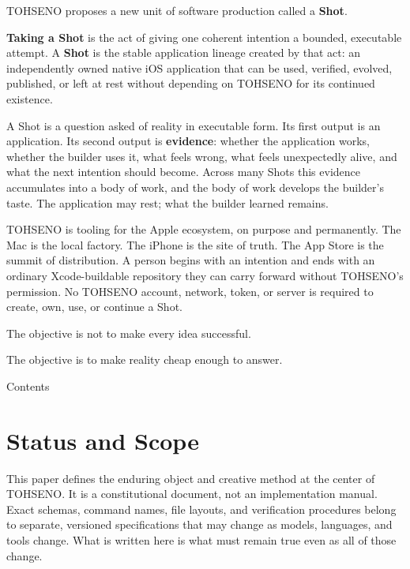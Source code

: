 \documentclass[11pt]{article}
\newcommand{\TOH}{TOHSENO}
\begin{document}
\TOH{} proposes a new unit of software production called a \textbf{Shot}.

\textbf{Taking a Shot} is the act of giving one coherent intention a
bounded, executable attempt. A \textbf{Shot} is the stable application
lineage created by that act: an independently owned native iOS
application that can be used, verified, evolved, published, or left at
rest without depending on \TOH{} for its continued existence.

A Shot is a question asked of reality in executable form. Its first
output is an application. Its second output is \textbf{evidence}:
whether the application works, whether the builder uses it, what feels
wrong, what feels unexpectedly alive, and what the next intention should
become. Across many Shots this evidence accumulates into a body of work,
and the body of work develops the builder's taste. The application may
rest; what the builder learned remains.

\TOH{} is tooling for the Apple ecosystem, on purpose and permanently.
The Mac is the local factory. The iPhone is the site of truth. The App
Store is the summit of distribution. A person begins with an intention
and ends with an ordinary Xcode-buildable repository they can carry
forward without \TOH{}'s permission. No \TOH{} account, network, token,
or server is required to create, own, use, or continue a Shot.

The objective is not to make every idea successful.

The objective is to make reality cheap enough to answer.

\clearpage
{\displayfont\LARGE Contents\par}
\vspace{1em}
\startcontents
{}
\clearpage

\section{Status and Scope}

This paper defines the enduring object and creative method at the center
of \TOH{}. It is a constitutional document, not an implementation
manual. Exact schemas, command names, file layouts, and verification
procedures belong to separate, versioned specifications that may change
as models, languages, and tools change. What is written here is what
must remain true even as all of those change.
\end{document}
